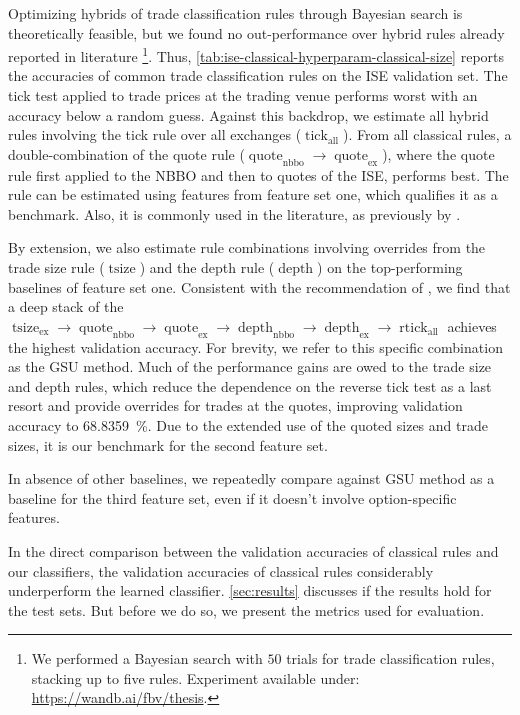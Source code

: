 Optimizing hybrids of trade classification rules through Bayesian search is theoretically feasible, but we found no out-performance over hybrid rules already reported in literature \footnote{We performed a Bayesian search with $50$ trials for trade classification rules, stacking up to five rules. Experiment available under: \url{https://wandb.ai/fbv/thesis}.}. Thus, \cref{tab:ise-classical-hyperparam-classical-size} reports the accuracies of common trade classification rules on the \gls{ISE} validation set. The tick test applied to trade prices at the trading venue performs worst with an accuracy below a random guess. Against this backdrop, we estimate all hybrid rules involving the tick rule over all exchanges ($\operatorname{tick}_{\text{all}}$). From all classical rules, a double-combination of the quote rule ($\operatorname{quote}_{\text{nbbo}} \to \operatorname{quote}_{\text{ex}}$), where the quote rule first applied to the \gls{NBBO} and then to quotes of the \gls{ISE}, performs best. The rule can be estimated using features from feature set one, which qualifies it as a benchmark. Also, it is commonly used in the literature, as previously by \textcite[][]{muravyevOptionsTradingCosts2020}.

By extension, we also estimate rule combinations involving overrides from the trade size rule ($\operatorname{tsize}$) and the depth rule ($\operatorname{depth}$) on the top-performing baselines of feature set one. Consistent with the recommendation of \textcite[][14]{grauerOptionTradeClassification2022}, we find that a deep stack of the $\operatorname{tsize}_{\text{ex}} \to \operatorname{quote}_{\text{nbbo}} \to \operatorname{quote}_{\text{ex}} \to \operatorname{depth}_{\text{nbbo}} \to \operatorname{depth}_{\text{ex}} \to \operatorname{rtick}_{\text{all}}$ achieves the highest validation accuracy. For brevity, we refer to this specific combination as the \gls{GSU} method. Much of the performance gains are owed to the trade size and depth rules, which reduce the dependence on the reverse tick test as a last resort and provide overrides for trades at the quotes, improving validation accuracy to \SI{68.8359}{\percent}. Due to the extended use of the quoted sizes and trade sizes, it is our benchmark for the second feature set.

In absence of other baselines, we repeatedly compare against \gls{GSU} method as a baseline for the third feature set, even if it doesn't involve option-specific features.

In the direct comparison between the validation accuracies of classical rules and our classifiers, the validation accuracies of classical rules considerably underperform the learned classifier. \cref{sec:results} discusses if the results hold for the test sets. But before we do so, we present the metrics used
for evaluation.


